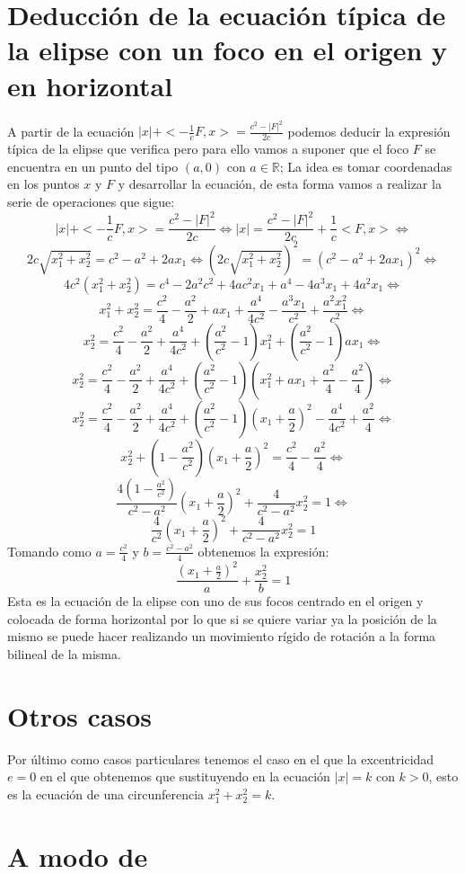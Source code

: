 \documentclass[a4paper, 11pt]{article} %
\begin{document}
	\section{Deducción de la ecuación típica de la elipse con un foco en el origen y en horizontal}
	A partir de la ecuación $|x|+<-\frac{1}{c}F,x> = \frac{c^2-|F|^2}{2c}$ podemos deducir la expresión típica de la elipse que verifica pero para ello vamos a suponer que el foco $F$ se encuentra en un punto del tipo $(a, 0)$ con $a\in \mathbb{R}$; La idea es tomar coordenadas en los puntos $x$ y $F$ y desarrollar la ecuación, de esta forma vamos a realizar la serie de operaciones que sigue:
	$$|x|+<-\frac{1}{c}F,x> = \frac{c^2-|F|^2}{2c} \Leftrightarrow |x| = \frac{c^2-|F|^2}{2c}+\frac{1}{c}<F,x> \Leftrightarrow$$
	$$2c\sqrt{x_1^2+x_2^2} = c^2-a^2+2ax_1 \Leftrightarrow (2c\sqrt{x_1^2+x_2^2})^2 = (c^2-a^2+2ax_1)^2 \Leftrightarrow$$
	$$4c^2(x_1^2+x_2^2)=c^4-2a^2c^2+4ac^2x_1+a^4-4a^3x_1+4a^2x_1 \Leftrightarrow$$
	$$x_1^2+x_2^2=\frac{c^2}{4}-\frac{a^2}{2}+ax_1+\frac{a^4}{4c^2}-\frac{a^3x_1}{c^2}+\frac{a^2x_1^2}{c^2} \Leftrightarrow$$
	$$x_2^2 = \frac{c^2}{4}-\frac{a^2}{2}+\frac{a^4}{4c^2}+(\frac{a^2}{c^2}-1)x_1^2 +(\frac{a^2}{c^2}-1)ax_1 \Leftrightarrow$$
	$$x_2^2 = \frac{c^2}{4}-\frac{a^2}{2}+\frac{a^4}{4c^2}+(\frac{a^2}{c^2}-1)(x_1^2 +ax_1+\frac{a^2}{4}-\frac{a^2}{4}) \Leftrightarrow$$
	$$x_2^2 = \frac{c^2}{4}-\frac{a^2}{2}+\frac{a^4}{4c^2}+(\frac{a^2}{c^2}-1)(x_1+\frac{a}{2})^2-\frac{a^4}{4c^2}+\frac{a^2}{4} \Leftrightarrow$$
	$$x_2^2+(1-\frac{a^2}{c^2})(x_1+\frac{a}{2})^2=\frac{c^2}{4}-\frac{a^2}{4} \Leftrightarrow$$
	$$\frac{4(1-\frac{a^2}{c^2})}{c^2-a^2}(x_1+\frac{a}{2})^2+\frac{4}{c^2-a^2}x_2^2=1 \Leftrightarrow$$
	$$\frac{4}{c^2}(x_1+\frac{a}{2})^2+\frac{4}{c^2-a^2}x_2^2=1$$
	Tomando como $a = \frac{c^2}{4}$ y $b = \frac{c^2-a^2}{4}$ obtenemos la expresión:
	$$\frac{(x_1+\frac{a}{2})^2}{a}+\frac{x_2^2}{b}=1$$
	Esta es la ecuación de la elipse con uno de sus focos centrado en el origen y colocada de forma horizontal por lo que si se quiere variar ya la posición de la mismo se puede hacer realizando un movimiento rígido de rotación a la forma bilineal de la misma.
	\section{Otros casos}
	Por último como casos particulares tenemos el caso en el que la excentricidad $e = 0$ en el que obtenemos que sustituyendo en la ecuación $|x|=k$ con $k >0$, esto es la ecuación de una circunferencia $x_1^2+x_2^2=k$.
	\section{A modo de }
	
\end{document}

